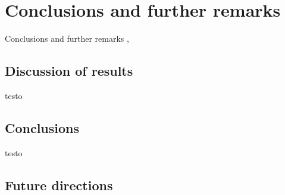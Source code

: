 \setchapterpreamble[u]{\margintoc}
\chapter{Conclusions and further remarks}

Conclusions and further remarks
, 

\section{Discussion of results} 

testo


\section{Conclusions} 

testo


\section{Future directions} 